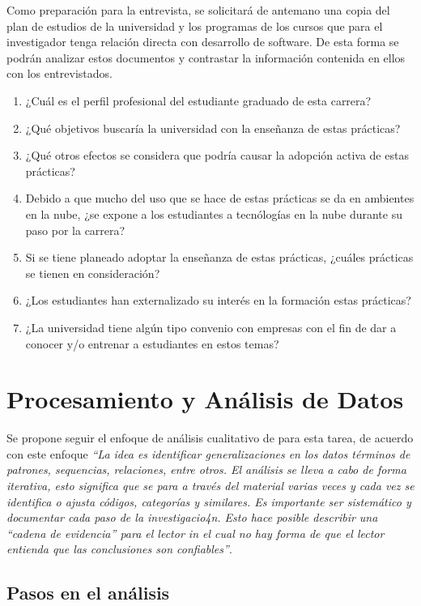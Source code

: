 Como preparación para la entrevista, se solicitará de antemano una copia del plan de estudios de la universidad y los programas de los cursos que para el investigador tenga relación directa con desarrollo de software. De esta forma se podrán analizar estos documentos y contrastar la información contenida en ellos con los entrevistados.

\begin{enumerate}
    \item ¿Cuál es el perfil profesional del estudiante graduado de esta carrera?
    \item ¿Qué objetivos buscaría la universidad con la enseñanza de estas prácticas?
    \item ¿Qué otros efectos se considera que podría causar la adopción activa de estas prácticas?
    \item Debido a que mucho del uso que se hace de estas prácticas se da en ambientes en la nube, ¿se expone a los estudiantes a tecnólogías en la nube durante su paso por la carrera?
    \item Si se tiene planeado adoptar la enseñanza de estas prácticas, ¿cuáles prácticas se tienen en consideración?
    \item ¿Los estudiantes han externalizado su interés en la formación estas prácticas?
    \item ¿La universidad tiene algún tipo convenio con empresas con el fin de dar a conocer y/o entrenar a estudiantes en estos temas?
\end{enumerate}



\section{Procesamiento y Análisis de Datos}
Se propone seguir el enfoque de análisis cualitativo de \cite{runeson-et-al} para esta tarea, de acuerdo con este enfoque \emph{``La idea es identificar generalizaciones en los datos términos de patrones, sequencias, relaciones, entre otros. El análisis se lleva a cabo de forma iterativa, esto significa que se para a través del material varias veces y cada vez se identifica o ajusta códigos, categorías y similares. Es importante ser sistemático y documentar cada paso de la investigacio4n. Esto hace posible describir una ``cadena de evidencia'' para el lector in el cual no hay forma de que el lector entienda que las conclusiones son confiables''}.


\subsection{Pasos en el análisis}

